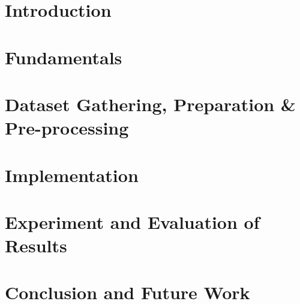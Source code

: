 \documentclass[12pt,a4paper]{report}
\begin{document}






\tableofcontents
\listoffigures
\listoftables
\listoflistings
\newpage
{}

\chapter{Introduction}
\label{chap:1}


\chapter{Fundamentals}
\label{chap:2}


\chapter{Dataset Gathering, Preparation \& Pre-processing}
\label{chap:3}


\chapter{Implementation}
\label{chap:4}


\chapter{Experiment and Evaluation of Results}
\label{chap:5}


\chapter{Conclusion and Future Work}
\label{chap:6}


\cleardoublepage
\begin{appendices}
\chapter{}

\end{appendices}


\end{document}
